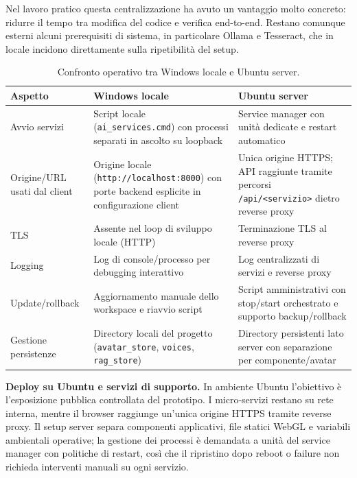 Nel lavoro pratico questa centralizzazione ha avuto un vantaggio molto concreto: ridurre il tempo tra modifica del codice e verifica end-to-end. Restano comunque esterni alcuni prerequisiti di sistema, in particolare Ollama e Tesseract, che in locale incidono direttamente sulla ripetibilità del setup.

\begin{table}[!htbp]
\centering
\footnotesize
\setlength{\tabcolsep}{3pt}
\renewcommand{\arraystretch}{1.2}
\begin{tabular}{|>{\raggedright\arraybackslash}p{}|>{\raggedright\arraybackslash}p{}|>{\raggedright\arraybackslash}p{}|}
\hline
\textbf{Aspetto} & \textbf{Windows locale} & \textbf{Ubuntu server} \\
\hline
Avvio servizi & Script locale (\texttt{ai\_services.cmd}) con processi separati in ascolto su loopback & Service manager con unità dedicate e restart automatico \\
\hline
Origine/URL usati dal client & Origine locale (\texttt{http://localhost:8000}) con porte backend esplicite in configurazione client & Unica origine HTTPS; API raggiunte tramite percorsi \texttt{/api/<servizio>} dietro reverse proxy \\
\hline
TLS & Assente nel loop di sviluppo locale (HTTP) & Terminazione TLS al reverse proxy \\
\hline
Logging & Log di console/processo per debugging interattivo & Log centralizzati di servizi e reverse proxy \\
\hline
Update/rollback & Aggiornamento manuale dello workspace e riavvio script & Script amministrativi con stop/start orchestrato e supporto backup/rollback \\
\hline
Gestione persistenze & Directory locali del progetto (\texttt{avatar\_store}, \texttt{voices}, \texttt{rag\_store}) & Directory persistenti lato server con separazione per componente/avatar \\
\hline
\end{tabular}
\caption[Windows locale e Ubuntu server]{Confronto operativo tra Windows locale e Ubuntu server.}
\label{tab:deploy-confronto-cap3}
\end{table}

\textbf{Deploy su Ubuntu e servizi di supporto.} In ambiente Ubuntu l'obiettivo è l'esposizione pubblica controllata del prototipo. I micro-servizi restano su rete interna, mentre il browser raggiunge un'unica origine HTTPS tramite reverse proxy. Il setup server separa componenti applicativi, file statici WebGL e variabili ambientali operative; la gestione dei processi è demandata a unità del service manager con politiche di restart, così che il ripristino dopo reboot o failure non richieda interventi manuali su ogni servizio.

